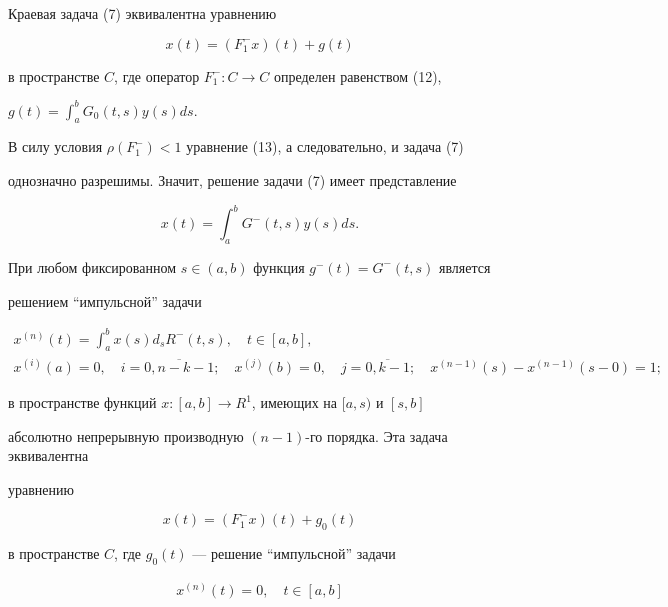 \begin{pf} Краевая задача (7) эквивалентна уравнению 


\begin{equation} 


x(t)=(F^-_1x)(t)+g(t) 


\end{equation} 


в пространстве $C$, где оператор $F^-_1:C\to C$ определен равенством (12), 


$g(t)=\int^b_aG_0(t,s)y(s)ds$. 


В силу условия $\rho(F^-_1)<1$ уравнение (13), а следовательно, и задача (7) 


однозначно разрешимы. Значит, решение задачи (7) имеет представление 


$$ 


x(t)=\int^b_aG^-(t,s)y(s)ds. 


$$ 


При любом фиксированном $s\in(a,b)$ функция $g^-(t)=G^-(t,s)$ является 


решением ``импульсной'' задачи \cite{Az1} 


\begin{gather*} 


x^{(n)}(t)=\int^b_ax(s)d_sR^-(t,s),\quad t\in[a,b],\\ 


x^{(i)}(a)=0,\quad i=\overline{0,n-k-1};\quad x^{(j)}(b)=0, 


\quad j=\overline{0,k-1};\quad x^{(n-1)}(s)-x^{(n-1)}(s-0)=1; 


\end{gather*} 


в пространстве функций $x:[a,b]\to R^1$, имеющих на $[a,s)$ и $[s,b]$ 


абсолютно непрерывную производную $(n-1)$-го порядка. Эта задача эквивалентна 


уравнению 


\begin{equation} 


x(t)=(F^-_1x)(t)+g_0(t) 


\end{equation} 


в пространстве $C$, где $g_0(t)$ --- решение ``импульсной'' задачи 


\begin{gather*} 


x^{(n)}(t)=0,\quad t\in[a,b]\\ 



\end{gather*}
\end{pf}
